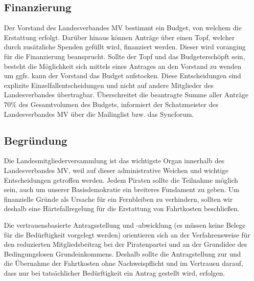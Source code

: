 \subsection{Finanzierung}

Der Vorstand des Landesverbandes MV bestimmt ein Budget, von welchem die Erstattung erfolgt. Darüber hinaus können Anträge über einen Topf, welcher durch zusätzliche Spenden gefüllt wird, finanziert werden. Dieser wird voranging für die Finanzierung beansprucht. Sollte der Topf und das Budgeterschöpft sein, besteht die Möglichkeit sich mittels eines Antrages an den Vorstand zu wenden um ggfs. kann der Vorstand das Budget aufstocken. Diese Entscheidungen sind explizite Einzelfallentscheidungen und nicht auf andere Mitglieder des Landesverbandes übertragbar. Überschreitet die beantragte Summe aller Anträge 70\% des Gesamtvolumen des Budgets, informiert der Schatzmeister des Landesverbandes MV über die Mailinglist bzw. das Syncforum.

\subsection{Begründung}

Die Landesmitgliederversammlung ist das wichtigste Organ innerhalb des Landesverbandes MV, weil auf dieser administrative Weichen und wichtige Entscheidungen getroffen werden. Jedem Piraten sollte die Teilnahme möglich sein, auch um unserer Basisdemokratie ein breiteres Fundament zu geben. Um finanzielle Gründe als Ursache für ein Fernbleiben zu verhindern, sollten wir deshalb eine Härtefallregelung für die Erstattung von Fahrtkosten beschließen.

Die vertrauensbasierte Antragsstellung und -abwicklung (es müssen keine Belege für die Bedürftigkeit vorgelegt werden) orientieren sich an der Verfahrensweise für den reduzierten Mitgliedsbeitrag bei der Piratenpartei und an der Grundidee des Bedingungslosen Grundeinkommens. Deshalb sollte die Antragstellung zur und die Übernahme der Fahrtkosten ohne Nachweispflicht und im Vertrauen darauf, dass nur bei tatsächlicher Bedürftigkeit ein Antrag gestellt wird, erfolgen.
